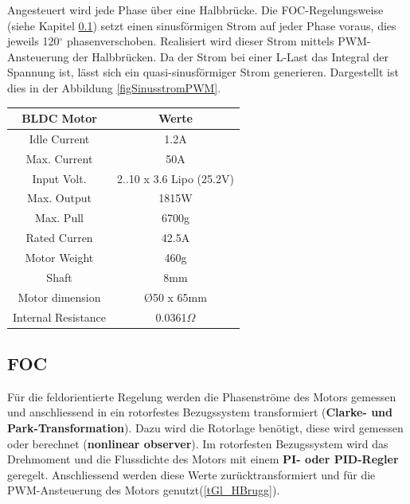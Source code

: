 Angesteuert wird jede Phase über eine Halbbrücke. Die FOC-Regelungsweise (siehe Kapitel \ref{tGl_FOC}) setzt einen sinusförmigen Strom auf jeder Phase voraus, dies jeweils 120\(^\circ\) phasenverschoben. Realisiert wird dieser Strom mittels PWM-Ansteuerung der Halbbrücken. Da der Strom bei einer L-Last das Integral der Spannung ist, lässt sich ein quasi-sinusförmiger Strom generieren. Dargestellt ist dies in der Abbildung \ref{figSinusstromPWM}.

\begin{center}
\begin{tabular}{|c|c|}
\hline 
\rule[-1ex]{0pt}{2.5ex}  BLDC Motor & Werte  \\ 
\hline 
\rule[-1ex]{0pt}{2.5ex} Idle Current & 1.2A \\ 
\hline 
\rule[-1ex]{0pt}{2.5ex} Max. Current & 50A \\ 
\hline
\rule[-1ex]{0pt}{2.5ex} Input Volt. & 2..10 x 3.6 Lipo (25.2V) \\ 
\hline
\rule[-1ex]{0pt}{2.5ex} Max. Output & 1815W \\ 
\hline
\rule[-1ex]{0pt}{2.5ex} Max. Pull & 6700g \\ 
\hline
\rule[-1ex]{0pt}{2.5ex} Rated Curren & 42.5A \\ 
\hline
\rule[-1ex]{0pt}{2.5ex} Motor Weight & 460g \\ 
\hline
\rule[-1ex]{0pt}{2.5ex} Shaft & 8mm \\ 
\hline
\rule[-1ex]{0pt}{2.5ex} Motor dimension & \O 50 x 65mm \\ 
\hline
\rule[-1ex]{0pt}{2.5ex} Internal Resistance & 0.0361$\Omega$ \\ 
\hline	
\end{tabular} 
\label{tabBLDCdaten}
\end{center}




\subsection{FOC}
\label{tGl_FOC}

Für die feldorientierte Regelung werden die Phasenströme des Motors gemessen und anschliessend in ein rotorfestes Bezugssystem transformiert (\textbf{Clarke- und Park-Transformation}). Dazu wird die Rotorlage benötigt, diese wird gemessen oder berechnet (\textbf{nonlinear observer}). Im rotorfesten Bezugssystem wird das Drehmoment und die Flussdichte des Motors mit einem \textbf{PI- oder PID-Regler} geregelt. Anschliessend werden diese Werte zurücktransformiert und für die PWM-Ansteuerung des Motors genutzt(\ref{tGl_HBrugg}). 

